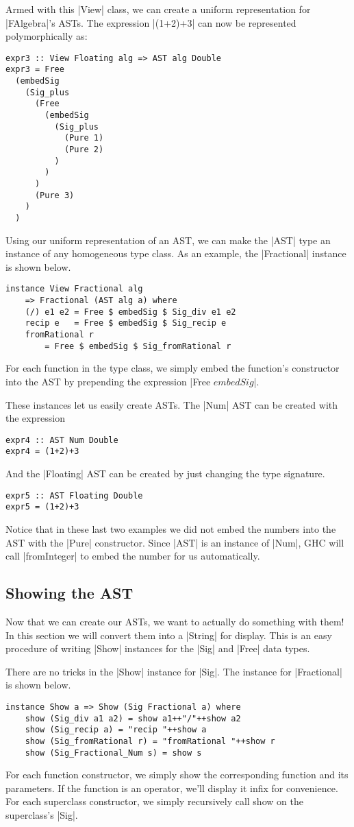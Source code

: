 \documentclass[preprint]{sigplanconf}
\theoremstyle{definition}
\begin{document}
Armed with this |View| class, we can create a uniform representation for |FAlgebra|'s ASTs.
The expression |(1+2)+3| can now be represented polymorphically as:
\begin{lstlisting}
expr3 :: View Floating alg => AST alg Double
expr3 = Free
  (embedSig
    (Sig_plus
      (Free
        (embedSig
          (Sig_plus
            (Pure 1)
            (Pure 2)
          )
        )
      )
      (Pure 3)
    )
  )
\end{lstlisting}

Using our uniform representation of an AST,
we can make the |AST| type an instance of any homogeneous type class.
As an example, the |Fractional| instance is shown below.
\begin{lstlisting}
instance View Fractional alg
    => Fractional (AST alg a) where
    (/) e1 e2 = Free $ embedSig $ Sig_div e1 e2
    recip e   = Free $ embedSig $ Sig_recip e
    fromRational r
        = Free $ embedSig $ Sig_fromRational r
\end{lstlisting}
For each function in the type class,
we simply embed the function's constructor into the AST by prepending the expression |Free $ embedSig $|.

These instances let us easily create ASTs.
The |Num| AST can be created with the expression
\begin{lstlisting}
expr4 :: AST Num Double
expr4 = (1+2)+3
\end{lstlisting}
And the |Floating| AST can be created by just changing the type signature.
\begin{lstlisting}
expr5 :: AST Floating Double
expr5 = (1+2)+3
\end{lstlisting}
Notice that in these last two examples we did not embed the numbers into the AST with the |Pure| constructor.
Since |AST| is an instance of |Num|,
GHC will call |fromInteger| to embed the number for us automatically.

\subsection{Showing the AST}
Now that we can create our ASTs, we want to actually do something with them!
In this section we will convert them into a |String| for display.
This is an easy procedure of writing |Show| instances for the |Sig| and |Free| data types.

There are no tricks in the |Show| instance for |Sig|.
The instance for |Fractional| is shown below.
\begin{lstlisting}
instance Show a => Show (Sig Fractional a) where
    show (Sig_div a1 a2) = show a1++"/"++show a2
    show (Sig_recip a) = "recip "++show a
    show (Sig_fromRational r) = "fromRational "++show r
    show (Sig_Fractional_Num s) = show s
\end{lstlisting}
For each function constructor, we simply show the corresponding function and its parameters.
If the function is an operator, we'll display it infix for convenience.
For each superclass constructor, we simply recursively call show on the superclass's |Sig|.
\end{document}

